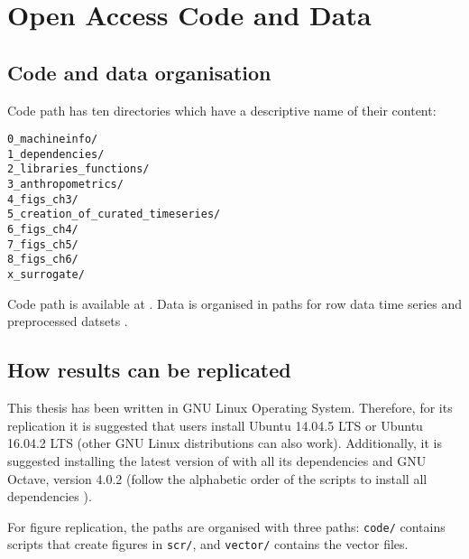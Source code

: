 \chapter{Open Access Code and Data} \label{appendix:f}

\section{Code and data organisation} 
Code path has ten directories which have a descriptive name of their content: 
\begin{verbatim}
0_machineinfo/
1_dependencies/  
2_libraries_functions/  
3_anthropometrics/      
4_figs_ch3/                        
5_creation_of_curated_timeseries/  
6_figs_ch4/  
7_figs_ch5/  
8_figs_ch6/
x_surrogate/
\end{verbatim}
Code path is available at .
Data is organised in paths for row data time series and 
preprocessed datsets .

\section{How results can be replicated} 
This thesis has been written in GNU Linux Operating System.
Therefore, for its replication it is suggested that users
install Ubuntu 14.04.5 LTS or Ubuntu 16.04.2 LTS 
(other GNU Linux distributions can also work).
Additionally, it is suggested installing the latest version of \R 
with all its dependencies and GNU Octave, version 4.0.2
(follow the alphabetic order of the scripts
to install all dependencies 
).

For figure replication, the paths are organised with three 
paths: \texttt{code/} contains \R scripts that create figures in \texttt{scr/}, 
and \texttt{vector/} contains the vector files.


 

